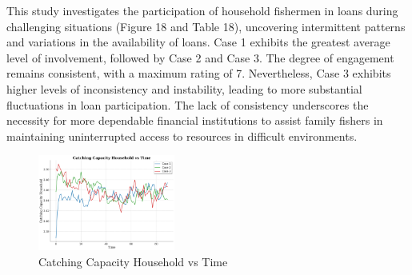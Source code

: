 \documentclass[final,5p,times,twocolumn,authoryear]{elsarticle}
\begin{document}
This study investigates the participation of household fishermen in loans during challenging situations (Figure 18 and Table 18), uncovering intermittent patterns and variations in the availability of loans. Case 1 exhibits the greatest average level of involvement, followed by Case 2 and Case 3. The degree of engagement remains consistent, with a maximum rating of 7. Nevertheless, Case 3 exhibits higher levels of inconsistency and instability, leading to more substantial fluctuations in loan participation. The lack of consistency underscores the necessity for more dependable financial institutions to assist family fishers in maintaining uninterrupted access to resources in difficult environments.\\
\begin{figure}[htbp]
    \centering
    \includegraphics[width=0.4\textwidth]{graph_all/plots_crit/catching_capacity_household_vs_time.png}
    \caption{Catching Capacity Household vs Time}
    \label{fig:catching_household}
\end{figure}
\end{document}
